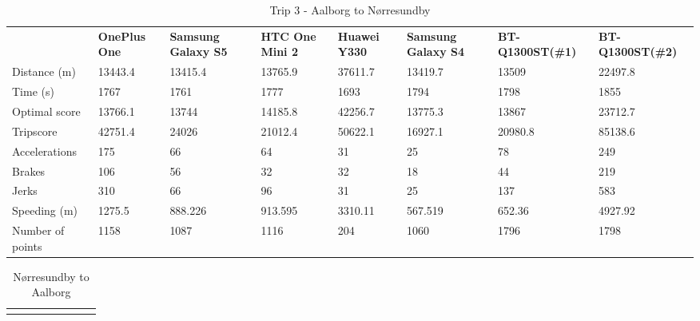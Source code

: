 \begin{landscape}
\begin{table*}[h]
\hspace{-2.5in}
\begin{minipage}{0.95\textwidth}
\caption{Trip 3 - Aalborg to Nørresundby}
\label{exp1trip3}
\begin{tabular}{|l|lllllll|}
\hline
\rowcolor{tablegreen}

                 & \textbf{OnePlus One} & \textbf{Samsung Galaxy S5} & \textbf{HTC One Mini 2} & \textbf{Huawei Y330} & \textbf{Samsung Galaxy S4} & \textbf{BT-Q1300ST(\#1)} & \textbf{BT-Q1300ST(\#2)} \\
Distance (m)     & 13443.4     & 13415.4           & 13765.9        & 37611.7     & 13419.7           & 13509           & 22497.8         \\
Time (s)         & 1767        & 1761              & 1777           & 1693        & 1794              & 1798            & 1855            \\
Optimal score    & 13766.1     & 13744             & 14185.8        & 42256.7     & 13775.3           & 13867           & 23712.7         \\
Tripscore        & 42751.4     & 24026             & 21012.4        & 50622.1     & 16927.1           & 20980.8         & 85138.6         \\
Accelerations    & 175         & 66                & 64             & 31          & 25                & 78              & 249             \\
Brakes           & 106         & 56                & 32             & 32          & 18                & 44              & 219             \\
Jerks            & 310         & 66                & 96             & 31          & 25                & 137             & 583             \\
Speeding (m)     & 1275.5      & 888.226           & 913.595        & 3310.11     & 567.519           & 652.36          & 4927.92         \\
Number of points & 1158        & 1087              & 1116           & 204         & 1060              & 1796            & 1798      \\\hline     
\end{tabular}
\end{minipage}
\end{table*}
\vspace{10 mm}
\begin{table*}[h]
\hspace{-2.5in}
\begin{minipage}{0.95\textwidth}
\hspace*{-2.5in}
\caption{Nørresundby to Aalborg}
\label{exp1trip4}
\begin{tabular}{|l|lllllll|}
\hline
\rowcolor{tablegreen}


\end{tabular}
\end{minipage}
\end{table*}
\end{landscape}
